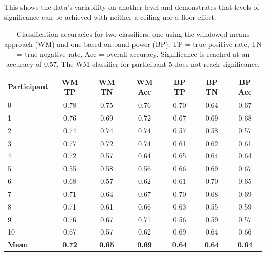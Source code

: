 This shows the data's variability on another level and demonstrates that levels of significance can be achieved with neither a ceiling nor a floor effect.

\begin{table}[ht]
    \centering
    \begin{tabular}{lcccccc}
    \hline
    \textbf{Participant} & \textbf{WM TP} & \textbf{WM TN} & \textbf{WM Acc} & \textbf{BP TP} & \textbf{BP TN} & \textbf{BP Acc} \\
    \hline
    0           & 0.78   & 0.75   & 0.76    & 0.70    & 0.64    & 0.67     \\
    1           & 0.76   & 0.69   & 0.72    & 0.67    & 0.69    & 0.68     \\
    2           & 0.74   & 0.74   & 0.74    & 0.57    & 0.58    & 0.57     \\
    3           & 0.77   & 0.72   & 0.74    & 0.61    & 0.62    & 0.61     \\
    4           & 0.72   & 0.57   & 0.64    & 0.65    & 0.64    & 0.64     \\
    5           & 0.55   & 0.58   & 0.56    & 0.66    & 0.69    & 0.67     \\
    6           & 0.68   & 0.57   & 0.62    & 0.61    & 0.70    & 0.65     \\
    7           & 0.71   & 0.64   & 0.67    & 0.70    & 0.68    & 0.69     \\
    8           & 0.71   & 0.61   & 0.66    & 0.63    & 0.55    & 0.59     \\
    9           & 0.76   & 0.67   & 0.71    & 0.56    & 0.59    & 0.57     \\
    10          & 0.67   & 0.57   & 0.62    & 0.69    & 0.64    & 0.66     \\
    \textbf{Mean}        & \textbf{0.72}   & \textbf{0.65}   & \textbf{0.69}    & \textbf{0.64}    & \textbf{0.64}    & \textbf{0.64} \\
    \hline
    \end{tabular}
    \caption[Classification accuracies for windowed-means and band-power classifiers on simulated data.]{Classification accuracies for two classifiers, one using the windowed means approach (WM) and one based on band power (BP). TP = true positive rate, TN = true negative rate, Acc = overall accuracy. Significance is reached at an accuracy of 0.57. The WM classifier for participant 5 does not reach significance.}
    \label{tab:sereega:bci}
\end{table}


